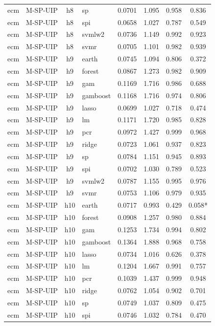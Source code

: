 \begin{ThreePartTable}
\begin{longtable}[t]{llclcccc}
ecm & M-SP-UIP & h8 & sp & 0.0701 & 1.095 & 0.958 & 0.836\\
ecm & M-SP-UIP & h8 & spi & 0.0658 & 1.027 & 0.787 & 0.549\\
ecm & M-SP-UIP & h8 & svmlw2 & 0.0736 & 1.149 & 0.992 & 0.923\\
ecm & M-SP-UIP & h8 & svmr & 0.0705 & 1.101 & 0.982 & 0.939\\
\addlinespace
ecm & M-SP-UIP & h9 & earth & 0.0745 & 1.094 & 0.806 & 0.372\\
ecm & M-SP-UIP & h9 & forest & 0.0867 & 1.273 & 0.982 & 0.909\\
ecm & M-SP-UIP & h9 & gam & 0.1169 & 1.716 & 0.986 & 0.688\\
ecm & M-SP-UIP & h9 & gamboost & 0.1168 & 1.716 & 0.974 & 0.806\\
ecm & M-SP-UIP & h9 & lasso & 0.0699 & 1.027 & 0.718 & 0.474\\
ecm & M-SP-UIP & h9 & lm & 0.1171 & 1.720 & 0.985 & 0.828\\
ecm & M-SP-UIP & h9 & pcr & 0.0972 & 1.427 & 0.999 & 0.968\\
ecm & M-SP-UIP & h9 & ridge & 0.0723 & 1.061 & 0.937 & 0.823\\
ecm & M-SP-UIP & h9 & sp & 0.0784 & 1.151 & 0.945 & 0.893\\
ecm & M-SP-UIP & h9 & spi & 0.0702 & 1.030 & 0.789 & 0.523\\
ecm & M-SP-UIP & h9 & svmlw2 & 0.0787 & 1.155 & 0.995 & 0.976\\
ecm & M-SP-UIP & h9 & svmr & 0.0753 & 1.106 & 0.979 & 0.935\\
\addlinespace
ecm & M-SP-UIP & h10 & earth & 0.0717 & 0.993 & 0.429 & 0.058*\\
ecm & M-SP-UIP & h10 & forest & 0.0908 & 1.257 & 0.980 & 0.884\\
ecm & M-SP-UIP & h10 & gam & 0.1253 & 1.734 & 0.994 & 0.802\\
ecm & M-SP-UIP & h10 & gamboost & 0.1364 & 1.888 & 0.968 & 0.758\\
ecm & M-SP-UIP & h10 & lasso & 0.0734 & 1.016 & 0.626 & 0.378\\
ecm & M-SP-UIP & h10 & lm & 0.1204 & 1.667 & 0.991 & 0.757\\
ecm & M-SP-UIP & h10 & pcr & 0.1039 & 1.437 & 0.999 & 0.948\\
ecm & M-SP-UIP & h10 & ridge & 0.0762 & 1.054 & 0.902 & 0.701\\
ecm & M-SP-UIP & h10 & sp & 0.0749 & 1.037 & 0.809 & 0.475\\
ecm & M-SP-UIP & h10 & spi & 0.0746 & 1.032 & 0.784 & 0.470\\

\end{longtable}
\end{ThreePartTable}
